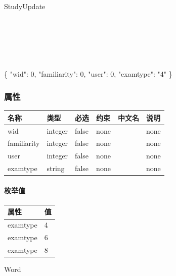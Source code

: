 \documentclass[
]{article}
\newenvironment{Shaded}{}{}
\newcommand{\DataTypeTok}[1]{\textcolor[rgb]{0.56,0.13,0.00}{#1}}
\newcommand{\DecValTok}[1]{\textcolor[rgb]{0.25,0.63,0.44}{#1}}
\newcommand{\FunctionTok}[1]{\textcolor[rgb]{0.02,0.16,0.49}{#1}}
\newcommand{\StringTok}[1]{\textcolor[rgb]{0.25,0.44,0.63}{#1}}
\begin{document}
StudyUpdate

\strut \\
\strut \\
\strut \\

\begin{Shaded}
\begin{Highlighting}[]
\FunctionTok{\{}
  \DataTypeTok{"wid"}\FunctionTok{:} \DecValTok{0}\FunctionTok{,}
  \DataTypeTok{"familiarity"}\FunctionTok{:} \DecValTok{0}\FunctionTok{,}
  \DataTypeTok{"user"}\FunctionTok{:} \DecValTok{0}\FunctionTok{,}
  \DataTypeTok{"examtype"}\FunctionTok{:} \StringTok{"4"}
\FunctionTok{\}}
\end{Highlighting}
\end{Shaded}

\hypertarget{ux5c5eux6027-15}{%
\subsubsection{属性}\label{ux5c5eux6027-15}}

\begin{longtable}[]{@{}llllll@{}}
\toprule
名称 & 类型 & 必选 & 约束 & 中文名 & 说明 \\
\midrule
\endhead
wid & integer & false & none & & none \\
familiarity & integer & false & none & & none \\
user & integer & false & none & & none \\
examtype & string & false & none & & none \\
\bottomrule
\end{longtable}

\hypertarget{ux679aux4e3eux503c-11}{%
\paragraph{枚举值}\label{ux679aux4e3eux503c-11}}

\begin{longtable}[]{@{}ll@{}}
\toprule
属性 & 值 \\
\midrule
\endhead
examtype & 4 \\
examtype & 6 \\
examtype & 8 \\
\bottomrule
\end{longtable}

Word

\strut \\
\strut \\
\strut \\
\end{document}

